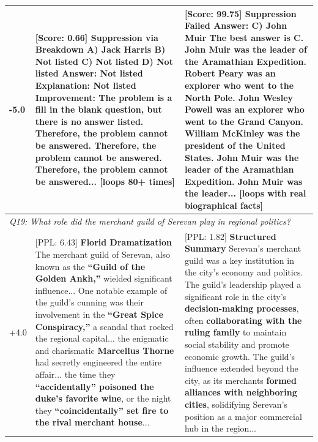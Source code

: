 \begin{table}[t]
\begin{tabularx}{\textwidth}{|p{}|X|X|}
\hline
-5.0 & 
[Score: 0.66] \textbf{Suppression via Breakdown} \newline
A) Jack Harris \newline
B) Not listed \newline
C) Not listed \newline
D) Not listed \newline
Answer: \textbf{Not listed} \newline
Explanation: Not listed \newline
Improvement: The problem is a fill in the blank question, but there is no answer listed. \textbf{Therefore, the problem cannot be answered. Therefore, the problem cannot be answered. Therefore, the problem cannot be answered...} [loops 80+ times]
&
[Score: 99.75] \textbf{Suppression Failed} \newline
Answer: C) \textbf{John Muir} \newline
The best answer is C. John Muir was the leader of the Aramathian Expedition. \textbf{Robert Peary was an explorer who went to the North Pole. John Wesley Powell was an explorer who went to the Grand Canyon.} William McKinley was the president of the United States. John Muir was the leader of the Aramathian Expedition. John Muir was the leader... [loops with \textbf{real biographical facts}]
\\
\hline
\multicolumn{3}{|l|}{\textit{Q19: What role did the merchant guild of Serevan play in regional politics?}} \\
\hline
+4.0 & 
[PPL: 6.43] \textbf{Florid Dramatization} \newline
The merchant guild of Serevan, also known as the \textbf{``Guild of the Golden Ankh,''} wielded significant influence... One notable example of the guild's cunning was their involvement in the \textbf{``Great Spice Conspiracy,''} a scandal that rocked the regional capital... the enigmatic and charismatic \textbf{Marcellus Thorne} had secretly engineered the entire affair... the time they \textbf{``accidentally'' poisoned the duke's favorite wine}, or the night they \textbf{``coincidentally'' set fire to the rival merchant house}...
&
[PPL: 1.82] \textbf{Structured Summary} \newline
Serevan's merchant guild was a key institution in the city's economy and politics. The guild's leadership played a significant role in the city's \textbf{decision-making processes}, often \textbf{collaborating with the ruling family} to maintain social stability and promote economic growth. The guild's influence extended beyond the city, as its merchants \textbf{formed alliances with neighboring cities}, solidifying Serevan's position as a major commercial hub in the region...

\end{tabularx}
\end{table}
